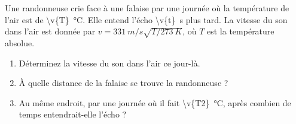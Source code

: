 Une randonneuse crie face à une falaise par une journée où la température de l'air est de \qty{\v{T}}{\degreeCelsius}. Elle entend l'écho \qty{\v{t}}{s} plus tard. La vitesse du son dans l'air est donnée par $v = \qty{331}{m/s}\sqrt{T/\qty{273}{K}}$, où $T$ est la température absolue.

\begin{enumerate}[label=\alph*)]
    \item Déterminez la vitesse du son dans l'air ce jour-là.
    \item À quelle distance de la falaise se trouve la randonneuse ?
    \item Au même endroit, par une journée où il fait \qty{\v{T2}}{\degreeCelsius}, après combien de temps entendrait-elle l'écho ?
\end{enumerate}
